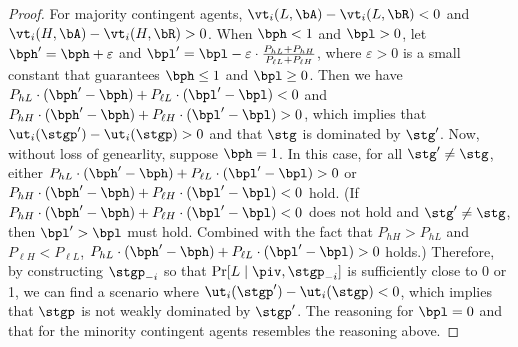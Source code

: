 \begin{proof}
For majority contingent agents, $\vt_i(L, \bA) - \vt_i(L, \bR) < 0$ and $\vt_i(H, \bA) - \vt_i(H, \bR) > 0$. When $\bph < 1$ and $\bpl > 0$, let $\bph' = \bph + \varepsilon$ and $\bpl' = \bpl - \varepsilon\cdot \frac{P_{hL} + P_{hH}}{P_{\ell L} + P_{\ell H}}$, where $\varepsilon > 0$ is a small constant that guarantees $\bph \le 1$ and $\bpl \ge 0$. Then we have $P_{hL} \cdot (\bph' - \bph) + P_{\ell L} \cdot (\bpl' - \bpl) < 0$ and $P_{hH} \cdot (\bph' - \bph) + P_{\ell H} \cdot (\bpl' - \bpl) > 0$, which implies that $\ut_i(\stgp') - \ut_i(\stgp) > 0$ and that $\stg$ is dominated by $\stg'$. Now, without loss of genearlity, suppose $\bph = 1$. In this case, for all $\stg' \neq \stg$, either $P_{hL} \cdot (\bph' - \bph) + P_{\ell L} \cdot (\bpl' - \bpl) > 0$ or $P_{hH} \cdot (\bph' - \bph) + P_{\ell H} \cdot (\bpl' - \bpl) < 0$ hold. (If $P_{hH} \cdot (\bph' - \bph) + P_{\ell H} \cdot (\bpl' - \bpl) < 0$ does not hold and $\stg' \neq \stg$, then $\bpl' > \bpl$ must hold. Combined with the fact that $P_{hH} > P_{hL}$ and $P_{\ell H} < P_{\ell L}$, $P_{hL} \cdot (\bph' - \bph) + P_{\ell L} \cdot (\bpl' - \bpl) > 0$ holds.) Therefore, by constructing $\stgp_{-i}$ so that $\Pr[L \mid \piv, \stgp_{-i}]$ is sufficiently close to 0 or 1, we can find a scenario where $\ut_i(\stgp') - \ut_i(\stgp) < 0$, which implies that $\stgp$ is not weakly dominated by $\stgp'$. 
The reasoning for $\bpl = 0$ and that for the minority contingent agents resembles the reasoning above. 
\end{proof}



